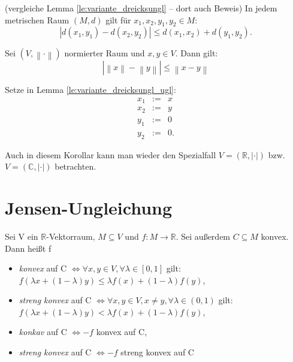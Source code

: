 \documentclass[10pt]{scrbook}
\begin{document}
\begin{Le}
\label{le:variante_dreicksungl_ugl}
(vergleiche Lemma \ref{le:variante_dreicksungl} -- dort auch Beweis)
In jedem metrischen Raum $(M, d)$ gilt für $x_1, x_2, y_1, y_2\in M$:
\begin{equation}
	\left|d(x_1, y_1)-d(x_2, y_2)\right|\leq d(x_1, x_2)+d(y_1, y_2).
\end{equation}
\end{Le}

\begin{Kor}
Sei $(V, \left\|\cdot\right\|)$ normierter Raum und $x, y\in V$. Dann gilt:
\begin{equation}
\left|\left\|x\right\|-\left\|y\right\|\right| \leq \left\|x-y\right\|
\end{equation}
\end{Kor}
\begin{bew}
Setze in Lemma \ref{le:variante_dreicksungl_ugl}:
\begin{eqnarray*}
x_1 & := & x \\
x_2 & := & y \\
y_1 & := & 0 \\
y_2 & := & 0.
\end{eqnarray*}
\end{bew}

Auch in diesem Korollar kann man wieder den Spezialfall $V=(\mathbb{R}, \left|\cdot\right|)$ bzw. $V=(\mathbb{C}, \left|\cdot\right|)$ betrachten.

\section{Jensen-Ungleichung}

\begin{Def}
\label{def:konvexe_fkt}
Sei V ein $\mathbb{R}$-Vektorraum, $M\subseteq V$ und $f: M\rightarrow \mathbb{R}$. Sei außerdem $C\subseteq M$ konvex. Dann heißt f
\begin{itemize}
\item \emph{konvex} auf C $\Leftrightarrow \forall x, y\in V, \forall \lambda \in\left[0, 1\right]$ gilt: $f(\lambda x+\left(1-\lambda\right) y) \leq \lambda f(x)+\left(1-\lambda\right) f(y)$,
\item \emph{streng konvex} auf C $\Leftrightarrow \forall x, y\in V, x\neq y, \forall \lambda \in\left(0, 1\right)$ gilt: $f(\lambda x+\left(1-\lambda\right) y) < \lambda f(x)+\left(1-\lambda\right) f(y)$,
\item \emph{konkav} auf C $\Leftrightarrow -f$ konvex auf C,
\item \emph{streng konvex} auf C $\Leftrightarrow -f$ streng konvex auf C
\end{itemize}
\end{Def}
\end{document}
